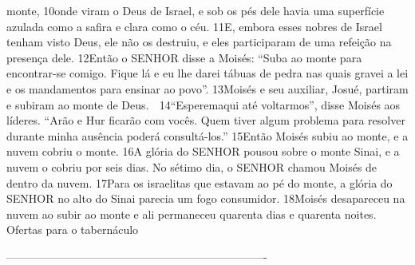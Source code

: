 monte, 10onde viram o Deus de Israel, e sob os pés dele havia uma superfície
azulada como a safira e clara como o céu. 11E, embora esses nobres de Israel
tenham visto Deus, ele não os destruiu, e eles participaram de uma refeição na
presença dele.
   12Então o SENHOR disse a Moisés: “Suba ao monte para encontrar-se comigo.
Fique lá e eu lhe darei tábuas de pedra nas quais gravei a lei e os mandamentos
para ensinar ao povo”. 13Moisés e seu auxiliar, Josué, partiram e subiram ao
monte de Deus.
    14“Esperemaqui até voltarmos”, disse Moisés aos líderes. “Arão e Hur ficarão
com vocês. Quem tiver algum problema para resolver durante minha ausência
poderá consultá-los.”
   15Então Moisés subiu ao monte, e a nuvem cobriu o monte. 16A glória do
SENHOR pousou sobre o monte Sinai, e a nuvem o cobriu por seis dias. No sétimo
dia, o SENHOR chamou Moisés de dentro da nuvem. 17Para os israelitas que
estavam ao pé do monte, a glória do SENHOR no alto do Sinai parecia um fogo
consumidor. 18Moisés desapareceu na nuvem ao subir ao monte e ali
permaneceu quarenta dias e quarenta noites.
Ofertas para o tabernáculo



----------------------------------------------------------------------
